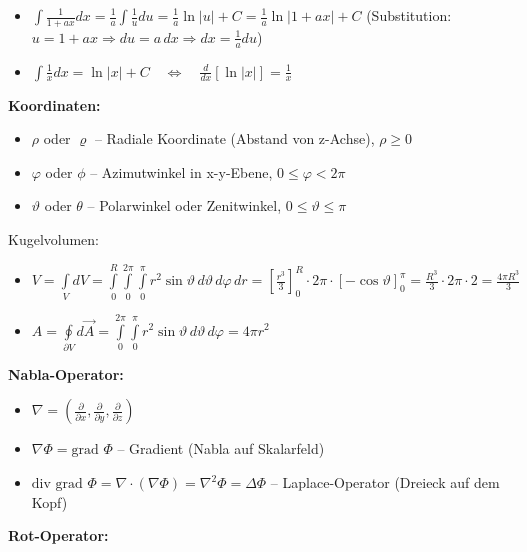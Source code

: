 \begin{itemize}
\item $\int \frac{1}{1+ax} dx = \frac{1}{a} \int \frac{1}{u} du = \frac{1}{a} \ln|u| + C = \frac{1}{a} \ln|1+ax| + C$ \quad\quad (Substitution: $u = 1 + ax \Rightarrow du = a \, dx \Rightarrow dx = \frac{1}{a} du$)
\item $\int \frac{1}{x} dx = \ln|x| + C \quad \Leftrightarrow \quad \frac{d}{dx}[\ln|x|] = \frac{1}{x}$
\end{itemize}




\textbf{Koordinaten:}
\begin{itemize}
\item $\rho$ oder $\varrho$ -- Radiale Koordinate (Abstand von z-Achse), $\rho \geq 0$
\item $\varphi$ oder $\phi$ -- Azimutwinkel in x-y-Ebene, $0 \leq \varphi < 2\pi$
\item $\vartheta$ oder $\theta$ -- Polarwinkel oder Zenitwinkel, $0 \leq \vartheta \leq \pi$
\end{itemize}

Kugelvolumen:
\begin{itemize}
\item $V = \int\limits_V dV = \int\limits_0^R \int\limits_0^{2\pi} \int\limits_0^{\pi} r^2 \sin\vartheta \, d\vartheta \, d\varphi \, dr = \left[\frac{r^3}{3}\right]_0^R \cdot 2\pi \cdot \left[-\cos\vartheta\right]_0^{\pi} = \frac{R^3}{3} \cdot 2\pi  \cdot 2 = \frac{4\pi R^3}{3}$

\item $A = \oint\limits_{\partial V} d\vec{A} = \int\limits_0^{2\pi} \int\limits_0^{\pi} r^2 \sin\vartheta \, d\vartheta \, d\varphi = 4\pi r^2$
\end{itemize}


\textbf{Nabla-Operator:}
\begin{itemize}
\item $\nabla = \left(\frac{\partial}{\partial x}, \frac{\partial}{\partial y}, \frac{\partial}{\partial z}\right)$
\item $\nabla \Phi = \text{grad } \Phi$ -- Gradient (Nabla auf Skalarfeld)
\item $\text{div grad } \Phi = \nabla \cdot (\nabla \Phi) =  \nabla^2 \Phi = \Delta \Phi$ -- Laplace-Operator (Dreieck auf dem Kopf)
\end{itemize}


\textbf{Rot-Operator:}

